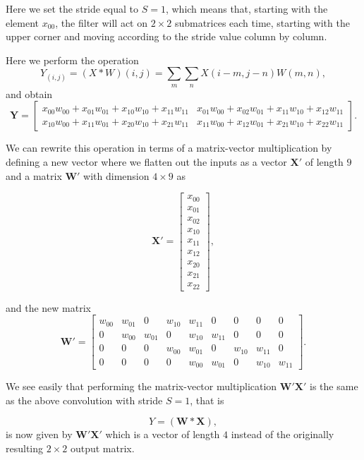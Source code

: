 \documentclass[%
oneside,                 %
final,                   %
10pt]{article}
\begin{document}
Here we set the stride equal to $S=1$, which means that, starting with the element $x_{00}$, the filter will act on $2\times 2$ submatrices each time, starting with the upper corner and moving according to the stride value column by column. 

Here we perform the operation
\[
Y_(i,j)=(X * W)(i,j) = \sum_m\sum_n X(i-m,j-n)W(m,n),
\]
and obtain
\[
\bm{Y}=\begin{bmatrix}x_{00}w_{00}+x_{01}w_{01}+x_{10}w_{10}+x_{11}w_{11} & x_{01}w_{00}+x_{02}w_{01}+x_{11}w_{10}+x_{12}w_{11}  \\
	              x_{10}w_{00}+x_{11}w_{01}+x_{20}w_{10}+x_{21}w_{11} & x_{11}w_{00}+x_{12}w_{01}+x_{21}w_{10}+x_{22}w_{11}\end{bmatrix}.
\]

We can rewrite this operation in terms of a matrix-vector multiplication by defining a new vector where we flatten out the inputs as a vector $\bm{X}'$ of length $9$ and
a matrix $\bm{W}'$ with dimension $4\times 9$ as

\[
\bm{X}'=\begin{bmatrix}x_{00} \\ x_{01} \\ x_{02} \\ x_{10} \\ x_{11} \\ x_{12} \\ x_{20} \\ x_{21} \\ x_{22} \end{bmatrix},
\]

and the new matrix
\[
\bm{W}'=\begin{bmatrix} w_{00} & w_{01} & 0 & w_{10} & w_{11} & 0 & 0 & 0 & 0 \\
                        0  & w_{00} & w_{01} & 0 & w_{10} & w_{11} & 0 & 0 & 0 \\
			0 & 0 & 0 & w_{00} & w_{01} & 0 & w_{10} & w_{11} & 0  \\
                        0 & 0 & 0 & 0 & w_{00} & w_{01} & 0 & w_{10} & w_{11}\end{bmatrix}.
\]

We see easily that performing the matrix-vector multiplication $\bm{W}'\bm{X}'$ is the same as the above convolution with stride $S=1$, that is

\[
Y=(\bm{W}*\bm{X}),
\]
is now given by $\bm{W}'\bm{X}'$ which is a vector of length $4$ instead of the originally resulting  $2\times 2$ output matrix.
\end{document}
